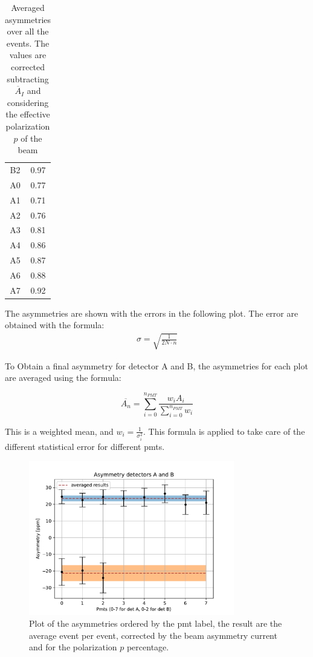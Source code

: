 \begin{table}[ht]
{\begin{tabular}{c|c}
 B2    & 0.97 \\
 A0    & 0.77 \\
 A1    & 0.71 \\
 A2    & 0.76 \\
 A3    & 0.81 \\
 A4    & 0.86 \\
 A5    & 0.87 \\
 A6    & 0.88 \\
 A7    & 0.92 \\
\hline
\end{tabular}}
\caption{Averaged asymmetries over all the events. The values are corrected subtracting $\overline{A}_{I}$ and considering the effective polarization $p$ of the beam}
\end{table}

The asymmetries are shown with the errors in the following plot. The error are obtained with the formula:
\begin{align*}
\sigma = \sqrt{\frac{1}{2 N \cdot n}}
\end{align*}

To Obtain a final asymmetry for detector A and B, the asymmetries for each plot are averaged using the formula:

\begin{equation}
\overline{A_{n}} = \sum_{i = 0}^{n_{PMT}} \dfrac{ w_{i} A_{i}}{\sum_{i = 0}^{n_{PMT}} w_{i}}
\end{equation}

This is a weighted mean, and $w_{i} = \frac{1}{\sigma^{2}_{i}}$. This formula is applied to take care of the different statistical error for different pmts.

\begin{figure}[hbtp]
\centering
\includegraphics[width = 0.80\textwidth]{Analysis/Dataselection/FirstResult.pdf}
\caption{Plot of the asymmetries ordered by the pmt label, the result are the average event per event, corrected by the beam asymmetry current and for the polarization $p$ percentage.}
\end{figure}

